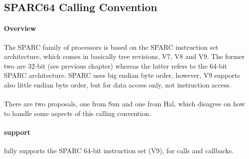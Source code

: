 %
%
%
%

\subsection{SPARC64 Calling Convention}

\paragraph{Overview}

The SPARC family of processors is based on the SPARC instruction set architecture, which comes in basically tree revisions,
V7, V8\cite{SPARCV8}\cite{SPARCSysV} and V9\cite{SPARCV9}\cite{SPARCV9SysV}. The former two are 32-bit (see previous chapter) whereas the latter refers to the 64-bit SPARC architecture.
SPARC uses big endian byte order, however, V9 supports also little endian byte order, but for data access only, not instruction access.\\
\\
There are two proposals, one from Sun and one from Hal, which disagree on how to handle some aspects of this calling convention.\\

\paragraph{ support}

 fully supports the SPARC 64-bit instruction set (V9), for calls and callbacks.

